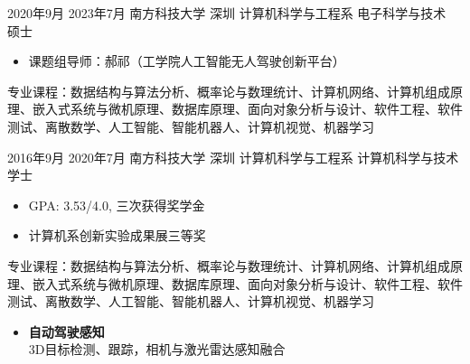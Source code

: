 \documentclass[zh]{resume}
\begin{document}
\makeheader

\begin{educations}
  \education%
    {2020年9月}%
    {2023年7月}%
    {南方科技大学}%
    {深圳}%
    {计算机科学与工程系}%
    {电子科学与技术}%
    {硕士}%
	{\begin{itemize}%
		\item 课题组导师：郝祁（工学院人工智能无人驾驶创新平台）
	\end{itemize}
	专业课程：数据结构与算法分析、概率论与数理统计、计算机网络、计算机组成原理、嵌入式系统与微机原理、数据库原理、面向对象分析与设计、软件工程、软件测试、离散数学、人工智能、智能机器人、计算机视觉、机器学习
	}%
  \education%
    {2016年9月}%
    {2020年7月}%
    {南方科技大学}%
    {深圳}%
    {计算机科学与工程系}%
    {计算机科学与技术}%
    {学士}%
	{\begin{itemize}%
		\item GPA: 3.53/4.0, 三次获得奖学金
		\item 计算机系创新实验成果展三等奖
	\end{itemize}
	专业课程：数据结构与算法分析、概率论与数理统计、计算机网络、计算机组成原理、嵌入式系统与微机原理、数据库原理、面向对象分析与设计、软件工程、软件测试、离散数学、人工智能、智能机器人、计算机视觉、机器学习
	}%
\end{educations}

\begin{itemize}
  \item \textbf{自动驾驶感知}\\
  	3D目标检测、跟踪，相机与激光雷达感知融合
\end{itemize}

\end{document}
